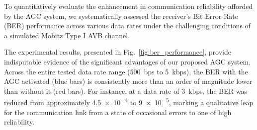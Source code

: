 \documentclass[journal]{IEEEtran}
\begin{document}

To quantitatively evaluate the enhancement in communication reliability afforded by the AGC system, we systematically assessed the receiver's Bit Error Rate (BER) performance across various data rates under the challenging conditions of a simulated Mobitz Type I AVB channel.

The experimental results, presented in Fig.~\ref{fig:ber_performance}, provide indisputable evidence of the significant advantages of our proposed AGC system. Across the entire tested data rate range (\SI{500}{bps} to \SI{5}{kbps}), the BER with the AGC activated (blue bars) is consistently more than an order of magnitude lower than without it (red bars). For instance, at a data rate of \SI{3}{kbps}, the BER was reduced from approximately \num{4.5e-4} to \num{9e-5}, marking a qualitative leap for the communication link from a state of occasional errors to one of high reliability.
\end{document}
